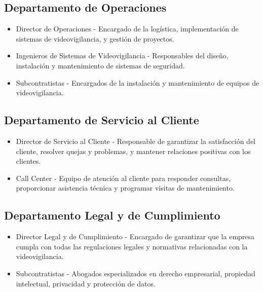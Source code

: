 \documentclass{report}
\begin{document}
          \subsection{Departamento de Operaciones}
            \begin{itemize}
            \item Director de Operaciones - Encargado de la logística, implementación de sistemas de videovigilancia, y gestión de proyectos.
            \item Ingenieros de Sistemas de Videovigilancia - Responsables del diseño, instalación y mantenimiento de sistemas de seguridad.
            \item Subcontratistas - Encargados de la instalación y mantenimiento de equipos de videovigilancia.
            \end{itemize}
          \subsection{Departamento de Servicio al Cliente}
            \begin{itemize}
            \item Director de Servicio al Cliente - Responsable de garantizar la satisfacción del cliente, resolver quejas y problemas, y mantener relaciones positivas con los clientes.
            \item Call Center - Equipo de atención al cliente para responder consultas, proporcionar asistencia técnica y programar visitas de mantenimiento.
            \end{itemize}
          \subsection{Departamento Legal y de Cumplimiento}
            \begin{itemize}
            \item Director Legal y de Cumplimiento - Encargado de garantizar que la empresa cumpla con todas las regulaciones legales y normativas relacionadas con la videovigilancia.
            \item Subcontratistas - Abogados especializados en derecho empresarial, propiedad intelectual, privacidad y protección de datos.
            \end{itemize}
\end{document}
